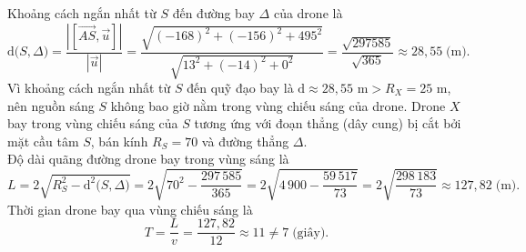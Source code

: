 \begin{ex}
{\begin{itemchoice}
			Khoảng cách ngắn nhất từ $S$ đến đường bay $\Delta$ của drone là \[\mathrm{d}\big(S,\Delta\big)=\dfrac{\left|\left[\overrightarrow{AS},\overrightarrow{u}\right]\right|}{\left|\overrightarrow{u}\right|}=\dfrac{\sqrt{(-168)^2+(-156)^2+495^2}}{\sqrt{13^2+(-14)^2+0^2}}=\dfrac{\sqrt{297585}}{\sqrt{365}}\approx 28{,}55\;\text{(m)}.\]
			Vì khoảng cách ngắn nhất từ $S$ đến quỹ đạo bay là $\mathrm{d}\approx 28{,}55$ m$>R_X=25$ m, nên nguồn sáng $S$ không bao giờ nằm trong vùng chiếu sáng của drone.
			\itemch Drone $X$ bay trong vùng chiếu sáng của $S$ tương ứng với đoạn thẳng (dây cung) bị cắt bởi mặt cầu tâm $S$, bán kính $R_S=70$ và đường thẳng $\Delta$.\\
			Độ dài quãng đường drone bay trong vùng sáng là
			\[L = 2\sqrt{R_S^2 - \mathrm{d}^2\big(S, \Delta\big)} = 2\sqrt{70^2 - \dfrac{297\,585}{365}} = 2\sqrt{4\,900 - \dfrac{59\,517}{73}} = 2\sqrt{\dfrac{298\,183}{73}} \approx 127{,}82 \;\text{(m)}.\]
			Thời gian drone bay qua vùng chiếu sáng là
			\[T = \dfrac{L}{v} = \dfrac{127{,}82}{12} \approx 11\ne7\;\text{(giây)}.\]
		\end{itemchoice}
	}
\end{ex}
\caukq
